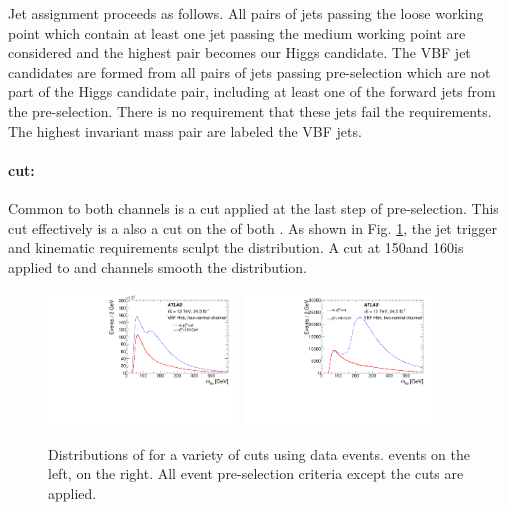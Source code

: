 Jet assignment proceeds as follows.  All pairs of \btagged jets passing the loose working point which contain at least one jet passing the medium working point are considered and the highest \pT pair becomes our Higgs candidate.  The VBF jet candidates are formed from all pairs of jets passing pre-selection which are not part of the Higgs candidate pair,  including at least one of the forward jets from the pre-selection.  There is no requirement that these jets fail  the \btagging requirements. The highest invariant mass pair are labeled the VBF jets. 



\paragraph{\pTbb cut:} Common to both channels is a \pTbb cut applied at the last step of pre-selection. This cut effectively is a also a cut on the \pT of both \bjets. As shown in Fig. \ref{fig:vbf-mbb_ptcuts}, the jet trigger and kinematic requirements sculpt the \Mbb distribution. A \pTbb cut at 150\GeV and 160\GeV is applied to \fourcentral and \twocentral channels smooth the \Mbb distribution.

\begin{figure}[htbp]
  \centering
 \includegraphics[width=0.45\textwidth]{figures/VBF/Presel-Mbb_4cen.pdf}
 \includegraphics[width=0.45\textwidth]{figures/VBF/Presel-Mbb_2cen.pdf}
 \caption{Distributions of \Mbb for a variety of \pTbb cuts using data events.  \fourcentral events on the left, \twocentral on the right.  All event pre-selection criteria except the \pTbb cuts are applied.}
  \label{fig:vbf-mbb_ptcuts}
\end{figure}


